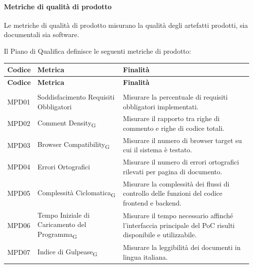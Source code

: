 \paragraph{Metriche di qualità di prodotto}

Le metriche di qualità di prodotto misurano la qualità degli artefatti prodotti,
sia documentali sia software.

Il Piano di Qualifica definisce le seguenti metriche di prodotto:

\begin{xltabular}{\textwidth}{
    >{\raggedright\arraybackslash}p{2.5cm}
    >{\raggedright\arraybackslash}X
    >{\raggedright\arraybackslash}p{6cm}
}
    \toprule
    \textbf{Codice} & \textbf{Metrica} & \textbf{Finalità} \\
    \midrule
    \endfirsthead

    \toprule
    \textbf{Codice} & \textbf{Metrica} & \textbf{Finalità} \\
    \midrule
    \endhead

    \midrule
     \\
    \endfoot

    \bottomrule
    \endlastfoot

    MPD01
    & Soddisfacimento Requisiti Obbligatori
    & Misurare la percentuale di requisiti obbligatori implementati. \\

    MPD02
    & Comment Density\textsubscript{G}
    & Misurare il rapporto tra righe di commento e righe di codice totali. \\

    MPD03
    & Browser Compatibility\textsubscript{G}
    & Misurare il numero di browser target su cui il sistema è testato. \\

    MPD04
    & Errori Ortografici
    & Misurare il numero di errori ortografici rilevati per pagina di documento. \\

    MPD05
    & Complessità Ciclomatica\textsubscript{G}
    & Misurare la complessità dei flussi di controllo delle funzioni del codice frontend e backend. \\

    MPD06
    & Tempo Iniziale di Caricamento del Programma\textsubscript{G}
    & Misurare il tempo necessario affinché l'interfaccia principale del PoC risulti disponibile e utilizzabile. \\

    MPD07
    & Indice di Gulpease\textsubscript{G}
    & Misurare la leggibilità dei documenti in lingua italiana. \\

\end{xltabular}

